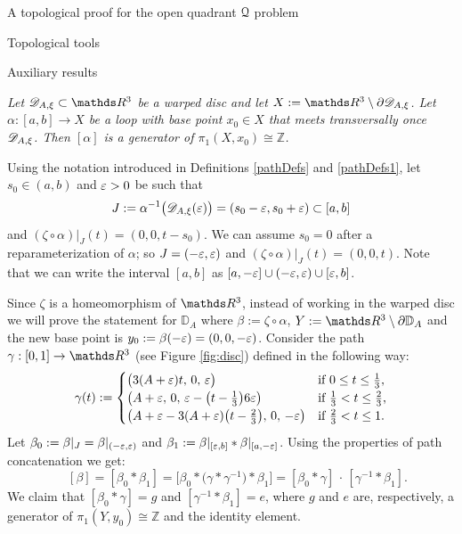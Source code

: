 \documentclass[11pt, a4paper, english, twoside, notitlepage, openright]{report}
\begin{document}
\begin{chapter}{A topological proof for the open quadrant $\mathcal{Q}$ problem}
\begin{section}{Topological tools}
\begin{subsection}{Auxiliary results}
\begin{lemma}\label{lemmaFundGr} \em Let $\D_{A,\xi}\subset\R^3$ be a warped disc and let $X:=\R^3\setminus\partial\D_{A,\xi}$. Let $\alpha:[a,b]\to X$ be a loop with base point $x_0\in X$ that meets transversally once $\mathscr{D}_{A,\xi}$. Then $[\alpha]$ is a generator of $\pi_1(X,x_0)\cong{\mathbb Z}$. \em 
\begin{Proof} 
Using the notation introduced in Definitions \ref{pathDefs} and \ref{pathDefs1}, let $s_0\in(a,b)$ and $\varepsilon>0$ be such that 
$$
J:=\alpha^{-1}\big(\mathscr{D}_{A,\xi}(\varepsilon)\big)=(s_0-\varepsilon,s_0+\varepsilon)\subset[a,b]
$$ 
and $(\zeta\circ\alpha)|_J(t)=(0,0,t-s_0)$. We can assume $s_0=0$ after a reparameterization of $\alpha$; so $J=(-\varepsilon,\varepsilon)$ and $(\zeta\circ\alpha)|_J(t)=(0,0,t)$. Note that we can write the interval $[a,b]$ as $[a,-\varepsilon]\cup(-\varepsilon,\varepsilon)\cup[\varepsilon,b]$.

\vspace{1mm}

Since $\zeta$ is a homeomorphism of $\R^3$, instead of working in the warped disc we will prove the statement for ${\mathbb D}_A$ where $\beta:=\zeta\circ\alpha$, $Y:=\R^3\setminus\partial{\mathbb D}_A$ and the new base point is $y_0:=\beta(-\varepsilon)=(0,0,-\varepsilon)$. Consider the path $\gamma:[0,1]\to\R^3$ (see Figure \ref{fig:disc}) defined in the following way:
$$
\gamma(t):=
\begin{cases}
\big(3(A+\varepsilon)t,\,0,\,\varepsilon\big)&\text{if $0\le t\le\frac{1}{3}$,}\\
\big(A+\varepsilon,\, 0,\, \varepsilon-\big(t-\frac{1}{3}\big)6\varepsilon\big)&\text{if $\frac{1}{3}<t\le \frac{2}{3}$,}\\
\big(A+\varepsilon-3(A+\varepsilon)\big(t-\frac{2}{3}\big),\, 0,\, -\varepsilon\big)&\text{if $\frac{2}{3}<t\le 1$}.
\end{cases}
$$
Let $\beta_0:=\beta|_{J}=\beta|_{(-\varepsilon,\varepsilon)}$ and $\beta_1:=\beta|_{[\varepsilon,b]}\ast\beta|_{[a,-\varepsilon]}$. Using the properties of path concatenation we get:
$$
\quad[\beta]=[\beta_0\ast\beta_1]=\big[\beta_0\ast\big(\gamma\ast\gamma^{-1}\big)\ast\beta_1\big]=[\beta_0\ast\gamma]\,\cdot\,[\gamma^{-1}\ast\beta_1].
$$
We claim that $[\beta_0\ast\gamma]=g$ and $[\gamma^{-1}\ast\beta_1]=e$, where $g$ and $e$ are, respectively, a generator of $\pi_1(Y,y_0)\cong{\mathbb Z}$ and the identity element.


\end{Proof}
\end{lemma}
\end{subsection}
\end{section}
\end{chapter}
\end{document}
